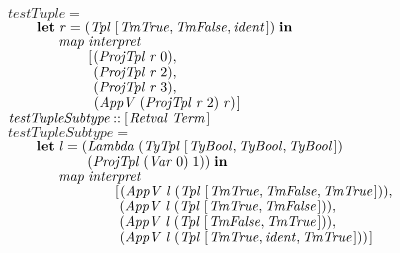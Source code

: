 \documentclass[10pt]{article}
\newcommand{\Conid}[1]{\mathit{#1}}
\newcommand{\Varid}[1]{\mathit{#1}}
\begin{document}
\begin{tabbing}
${\Varid{testTuple}\mathrel{=}}$\\
${\hskip2.00em\relax\mathbf{let}\;\Varid{r}\mathrel{=}(\Conid{Tpl}\;[\mskip1.5mu \Conid{TmTrue},\Conid{TmFalse},\Varid{ident}\mskip1.5mu])\;\mathbf{in}}$\\
${\hskip2.00em\relax\phantom{\mathbf{let}\;\mbox{}}\Varid{map}\;\Varid{interpret}\;}$\\
${\hskip2.00em\relax\phantom{\mathbf{let}\;\mbox{}}\phantom{\Varid{map}\;\mbox{}}[\mskip1.5mu (\Conid{ProjTpl}\;\Varid{r}\;\mathrm{0}),}$\\
${\hskip2.00em\relax\phantom{\mathbf{let}\;\mbox{}}\phantom{\Varid{map}\;\mbox{}}\phantom{[\mskip1.5mu \mbox{}}(\Conid{ProjTpl}\;\Varid{r}\;\mathrm{2}),}$\\
${\hskip2.00em\relax\phantom{\mathbf{let}\;\mbox{}}\phantom{\Varid{map}\;\mbox{}}\phantom{[\mskip1.5mu \mbox{}}(\Conid{ProjTpl}\;\Varid{r}\;\mathrm{3}),}$\\
${\hskip2.00em\relax\phantom{\mathbf{let}\;\mbox{}}\phantom{\Varid{map}\;\mbox{}}\phantom{[\mskip1.5mu \mbox{}}(\Conid{AppV}\;(\Conid{ProjTpl}\;\Varid{r}\;\mathrm{2})\;\Varid{r})\mskip1.5mu]}$\\
${}$\\
${\Varid{testTupleSubtype}\mathbin{::}[\mskip1.5mu \Conid{Retval}\;\Conid{Term}\mskip1.5mu]}$\\
${\Varid{testTupleSubtype}\mathrel{=}}$\\
${\hskip2.00em\relax\mathbf{let}\;\Varid{l}\mathrel{=}(\Conid{Lambda}\;(\Conid{TyTpl}\;[\mskip1.5mu \Conid{TyBool},\Conid{TyBool},\Conid{TyBool}\mskip1.5mu])}$\\
${\hskip2.00em\relax\phantom{\mathbf{let}\;\Varid{l}\mathrel{=}(\mbox{}}(\Conid{ProjTpl}\;(\Conid{Var}\;\mathrm{0})\;\mathrm{1}))\;\mathbf{in}}$\\
${\hskip2.00em\relax\phantom{\mathbf{let}\;\mbox{}}\Varid{map}\;\Varid{interpret}\;}$\\
${\hskip2.00em\relax\phantom{\mathbf{let}\;\mbox{}}\hskip4.00em\relax[\mskip1.5mu (\Conid{AppV}\;\Varid{l}\;(\Conid{Tpl}\;[\mskip1.5mu \Conid{TmTrue},\Conid{TmFalse},\Conid{TmTrue}\mskip1.5mu])),}$\\
${\hskip2.00em\relax\phantom{\mathbf{let}\;\mbox{}}\hskip4.00em\relax\phantom{[\mskip1.5mu \mbox{}}(\Conid{AppV}\;\Varid{l}\;(\Conid{Tpl}\;[\mskip1.5mu \Conid{TmTrue},\Conid{TmFalse}\mskip1.5mu])),}$\\
${\hskip2.00em\relax\phantom{\mathbf{let}\;\mbox{}}\hskip4.00em\relax\phantom{[\mskip1.5mu \mbox{}}(\Conid{AppV}\;\Varid{l}\;(\Conid{Tpl}\;[\mskip1.5mu \Conid{TmFalse},\Conid{TmTrue}\mskip1.5mu])),}$\\
${\hskip2.00em\relax\phantom{\mathbf{let}\;\mbox{}}\hskip4.00em\relax\phantom{[\mskip1.5mu \mbox{}}(\Conid{AppV}\;\Varid{l}\;(\Conid{Tpl}\;[\mskip1.5mu \Conid{TmTrue},\Varid{ident},\Conid{TmTrue}\mskip1.5mu]))\mskip1.5mu]}$
\end{tabbing}
\end{document}
